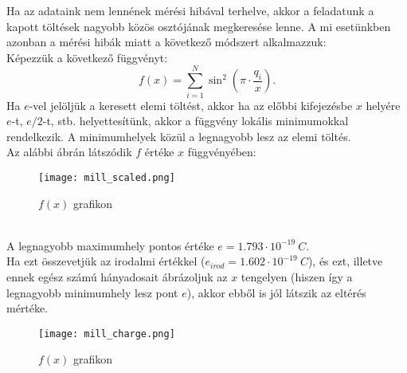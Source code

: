 \documentclass[a4paper]{article}
\begin{document}
Ha az adataink nem lennének mérési hibával terhelve, akkor a feladatunk a kapott töltések nagyobb közös osztójának megkeresése lenne. A mi esetünkben azonban a mérési hibák miatt a következő módszert alkalmazzuk:\\
Képezzük a következő függvényt:
\begin{equation}
f(x)=\sum_{i=1}^N \sin^2\left(\pi\cdot\frac{q_i}{x}\right).
\end{equation}
Ha $e$-vel jelöljük a keresett elemi töltést, akkor ha az előbbi kifejezésbe $x$ helyére $e$-t, $e/2$-t, stb. helyettesítünk, akkor a függvény lokális minimumokkal rendelkezik. A minimumhelyek közül a legnagyobb lesz az elemi töltés.\\
Az alábbi ábrán látszódik $f$ értéke $x$ függvényében:
\begin{figure}[h!]\centering
	\caption{$f(x)$ grafikon}
	\texttt{[image: mill\_scaled.png]}
\end{figure}\\
A legnagyobb maximumhely pontos értéke $e=1.793\cdot 10^{-19}\ C$.\\
Ha ezt összevetjük az irodalmi értékkel ($e_{irod}=1.602\cdot 10^{-19}\ C$), és ezt, illetve ennek egész számú hányadosait ábrázoljuk az $x$ tengelyen (hiszen így a legnagyobb minimumhely lesz pont $e$), akkor ebből is jól látszik az eltérés mértéke.
\begin{figure}[h!]\centering
	\caption{$f(x)$ grafikon}
	\texttt{[image: mill\_charge.png]}
\end{figure}
\end{document}
